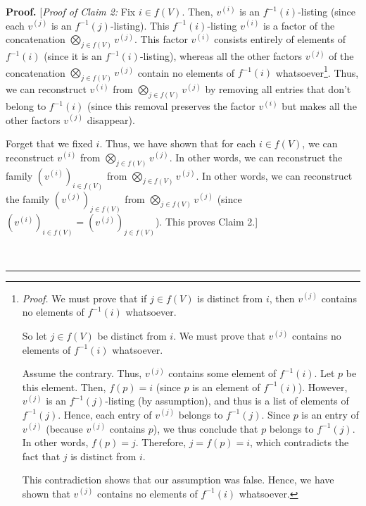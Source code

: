 \documentclass[numbers=enddot,12pt,final,onecolumn,notitlepage]{scrartcl}%
\numberwithin{exer}{section}
\theoremstyle{definition}
\newenvironment{proof}[1][Proof]{\noindent\textbf{#1.} }{\ \rule{0.5em}{0.5em}}
\newenvironment{verlong}{}{}
\begin{document}
\begin{verlong}
\begin{proof}
[\textit{Proof of Claim 2:} Fix $i\in f\left(  V\right)  $. Then, $v^{\left(
i\right)  }$ is an $f^{-1}\left(  i\right)  $-listing (since each $v^{\left(
j\right)  }$ is an $f^{-1}\left(  j\right)  $-listing). This $f^{-1}\left(
i\right)  $-listing $v^{\left(  i\right)  }$ is a factor of the concatenation
$\bigotimes\limits_{j\in f\left(  V\right)  }v^{\left(  j\right)  }$. This
factor $v^{\left(  i\right)  }$ consists entirely of elements of
$f^{-1}\left(  i\right)  $ (since it is an $f^{-1}\left(  i\right)
$-listing), whereas all the other factors $v^{\left(  j\right)  }$ of the
concatenation $\bigotimes\limits_{j\in f\left(  V\right)  }v^{\left(
j\right)  }$ contain no elements of $f^{-1}\left(  i\right)  $
whatsoever\footnote{\textit{Proof.} We must prove that if $j\in f\left(
V\right)  $ is distinct from $i$, then $v^{\left(  j\right)  }$ contains no
elements of $f^{-1}\left(  i\right)  $ whatsoever.
\par
So let $j\in f\left(  V\right)  $ be distinct from $i$. We must prove that
$v^{\left(  j\right)  }$ contains no elements of $f^{-1}\left(  i\right)  $
whatsoever.
\par
Assume the contrary. Thus, $v^{\left(  j\right)  }$ contains some element of
$f^{-1}\left(  i\right)  $. Let $p$ be this element. Then, $f\left(  p\right)
=i$ (since $p$ is an element of $f^{-1}\left(  i\right)  $). However,
$v^{\left(  j\right)  }$ is an $f^{-1}\left(  j\right)  $-listing (by
assumption), and thus is a list of elements of $f^{-1}\left(  j\right)  $.
Hence, each entry of $v^{\left(  j\right)  }$ belongs to $f^{-1}\left(
j\right)  $. Since $p$ is an entry of $v^{\left(  j\right)  }$ (because
$v^{\left(  j\right)  }$ contains $p$), we thus conclude that $p$ belongs to
$f^{-1}\left(  j\right)  $. In other words, $f\left(  p\right)  =j$.
Therefore, $j=f\left(  p\right)  =i$, which contradicts the fact that $j$ is
distinct from $i$.
\par
This contradiction shows that our assumption was false. Hence, we have shown
that $v^{\left(  j\right)  }$ contains no elements of $f^{-1}\left(  i\right)
$ whatsoever.}. Thus, we can reconstruct $v^{\left(  i\right)  }$ from
$\bigotimes\limits_{j\in f\left(  V\right)  }v^{\left(  j\right)  }$ by
removing all entries that don't belong to $f^{-1}\left(  i\right)  $ (since
this removal preserves the factor $v^{\left(  i\right)  }$ but makes all the
other factors $v^{\left(  j\right)  }$ disappear).

Forget that we fixed $i$. Thus, we have shown that for each $i\in f\left(
V\right)  $, we can reconstruct $v^{\left(  i\right)  }$ from $\bigotimes
\limits_{j\in f\left(  V\right)  }v^{\left(  j\right)  }$. In other words, we
can reconstruct the family $\left(  v^{\left(  i\right)  }\right)  _{i\in
f\left(  V\right)  }$ from $\bigotimes\limits_{j\in f\left(  V\right)
}v^{\left(  j\right)  }$. In other words, we can reconstruct the family
$\left(  v^{\left(  j\right)  }\right)  _{j\in f\left(  V\right)  }$ from
$\bigotimes\limits_{j\in f\left(  V\right)  }v^{\left(  j\right)  }$ (since
$\left(  v^{\left(  i\right)  }\right)  _{i\in f\left(  V\right)  }=\left(
v^{\left(  j\right)  }\right)  _{j\in f\left(  V\right)  }$). This proves
Claim 2.]


\end{proof}
\end{verlong}
\end{document}
